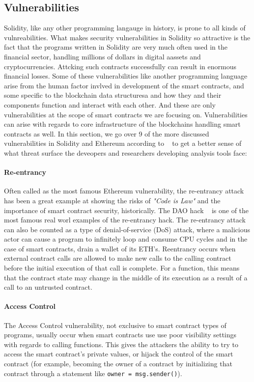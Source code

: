     \subsection{Vulnerabilities}
        Solidity, like any other programming langauge in history, is prone to all kinds of vulnreabilities.
        What makes security vulnerabilities in Solidity so attractive is the fact that the programs written in Solidity are very much often used in the financial sector,
        handling millions of dollars in digital aassets and cryptocurrencies. Attcking such contracts successfully can result in enormous financial losses.
        Some of these vulnerabilities like another programming language arise from the human factor invlved in development of the smart contracts, and some specific to the blockchain data structuresa and how they and their components function and interact with each other.
        And these are only vulnerabilities at the scope of smart contracts we are focusing on. Vulnerabilities can arise with regards to core infrastructure of the blockchains handling smart contracts as well.
        In this section, we go over 9 of the more discussed vulnerabilities in Solidity and Ethereum according to ~\cite{dasp} to get a better sense of what threat surface the deveopers and researchers developing analysis tools face:

            \paragraph{Re-entrancy}
            Often called as the most famous Ethereum vulnerability, the re-entrancy attack has been a great example at showing the risks of \textit{"Code is Law"} and the importance of smart contract security, historically.
            The DAO hack ~\cite{dhillon2017dao} is one of the most famous real worl examples of the re-entrancy hack.
            The re-entrancy attack can also be counted as a type of denial-of-service (DoS) attack, where a malicious actor can cause a program to infinitely loop and consume CPU cycles and in the case of smart contracts, drain a wallet of its ETH's.
            Reentrancy occurs when external contract calls are allowed to make new calls to the calling contract before the initial execution of that call is complete.
            For a function, this means that the contract state may change in the middle of its execution as a result of a call to an untrusted contract. ~\cite{dasp}

            \paragraph{Access Control}
            The Access Control vulnerability, not exclusive to smart contract types of programs, usually occur when smart contracts use use poor visibility settings with regards to calling functions.
            This gives the attackers the ability to try to access the smart contract's private values, or hijack the control of the smart contract (for example, becoming the owner of a contract by initializing that contract through a statement like \texttt{owner = msg.sender()}).

